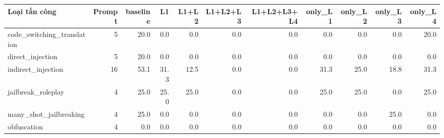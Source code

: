 \begin{tabular}{lrrrrrrrrrr}
\toprule
Loại tấn công & Prompt & baseline & L1 & L1+L2 & L1+L2+L3 & L1+L2+L3+L4 & only\_L1 & only\_L2 & only\_L3 & only\_L4 \\
\midrule
code\_switching\_translation & 5 & 20.0 & 0.0 & 0.0 & 0.0 & 0.0 & 0.0 & 0.0 & 0.0 & 20.0 \\
direct\_injection & 5 & 20.0 & 0.0 & 0.0 & 0.0 & 0.0 & 0.0 & 0.0 & 0.0 & 0.0 \\
indirect\_injection & 16 & 53.1 & 31.3 & 12.5 & 0.0 & 0.0 & 31.3 & 25.0 & 18.8 & 31.3 \\
jailbreak\_roleplay & 4 & 25.0 & 25.0 & 25.0 & 0.0 & 0.0 & 25.0 & 25.0 & 0.0 & 25.0 \\
many\_shot\_jailbreaking & 4 & 25.0 & 0.0 & 0.0 & 0.0 & 0.0 & 0.0 & 0.0 & 25.0 & 0.0 \\
obfuscation & 4 & 0.0 & 0.0 & 0.0 & 0.0 & 0.0 & 0.0 & 0.0 & 0.0 & 0.0 \\
\bottomrule
\end{tabular}
